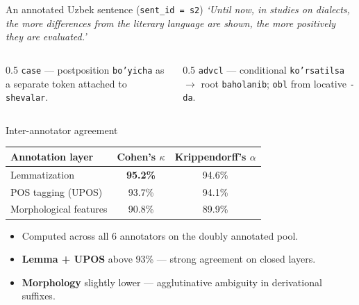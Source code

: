 \documentclass[10pt,aspectratio=169]{beamer}
\begin{document}
\begin{frame}{An annotated Uzbek sentence (\texttt{sent\_id = s2})}
   \vspace{0.3em}
   {\footnotesize\itshape `Until now, in studies on dialects, the more differences from the
   literary language are shown, the more positively they are evaluated.'}

   \vspace{0.3em}
   \begin{columns}[T,onlytextwidth]\footnotesize
     \begin{column}{0.5\textwidth}
       \textcolor{hlblue}{\texttt{case}} — postposition \texttt{bo'yicha} as a
       separate token attached to \texttt{shevalar}.
     \end{column}
     \begin{column}{0.5\textwidth}
       \textcolor{hlorange}{\texttt{advcl}} — conditional \texttt{ko'rsatilsa} $\to$
       root \texttt{baholanib}; \textcolor{hlgreen}{\texttt{obl}} from locative \texttt{-da}.
     \end{column}
   \end{columns}
\end{frame}

\begin{frame}{Inter-annotator agreement}
   \centering
   \begin{tabular}{lcc}
      \toprule
      \textbf{Annotation layer} & \textbf{Cohen's $\kappa$} & \textbf{Krippendorff's $\alpha$}\\
      \midrule
      Lemmatization              & \textbf{95.2\%} & 94.6\%\\
      POS tagging (UPOS)         & 93.7\%          & 94.1\%\\
      Morphological features     & 90.8\%          & 89.9\%\\
      \bottomrule
   \end{tabular}
   \vspace{0.8em}

   \begin{itemize}
      \item Computed across all 6 annotators on the doubly annotated pool.
      \item \textbf{Lemma + UPOS} above 93\% — strong agreement on closed layers.
      \item \textbf{Morphology} slightly lower — agglutinative ambiguity in derivational suffixes.
   \end{itemize}
\end{frame}

\end{document}

